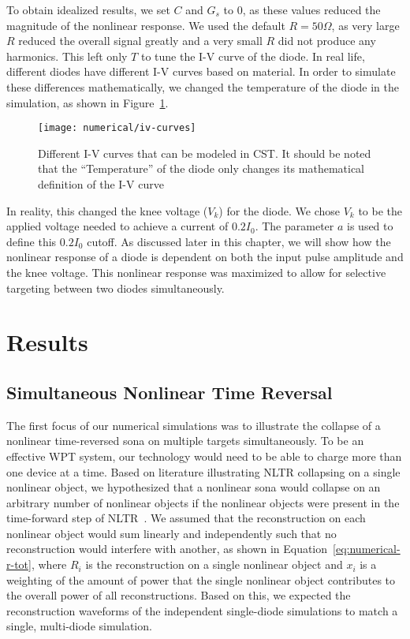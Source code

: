 To obtain idealized results, we set $C$ and $G_s$ to $0$, as these values reduced the magnitude of the nonlinear response. We used the default $R = 50 \Omega$, as very large $R$ reduced the overall signal greatly and a very small $R$ did not produce any harmonics. This left only $T$ to tune the I-V curve of the diode. In real life, different diodes have different I-V curves based on material. In order to simulate these differences mathematically, we changed the temperature of the diode in the simulation, as shown in Figure~\ref{fig:numerical-iv-curves}.

\begin{figure}[t]
\centering
\texttt{[image: numerical/iv-curves]}
\caption[I-V curves of diodes with different voltage knees]{Different I-V curves that can be modeled in CST. It should be noted that the ``Temperature'' of the diode only changes its mathematical definition of the I-V curve}
\label{fig:numerical-iv-curves}
\end{figure}

In reality, this changed the knee voltage ($V_{k}$) for the diode. We chose $V_{k}$ to be the applied voltage needed to achieve a current of $0.2 I_{0}$. The parameter $a$ is used to define this $0.2 I_{0}$ cutoff. As discussed later in this chapter, we will show how the nonlinear response of a diode is dependent on both the input pulse amplitude and the knee voltage. This nonlinear response was maximized to allow for selective targeting between two diodes simultaneously.
\section{Results}
\label{sec:numerical-results}

\subsection{Simultaneous Nonlinear Time Reversal}

The first focus of our numerical simulations was to illustrate the collapse of a nonlinear time-reversed sona on multiple targets simultaneously. To be an effective WPT system, our technology would need to be able to charge more than one device at a time. Based on literature illustrating NLTR collapsing on a single nonlinear object, we hypothesized that a nonlinear sona would collapse on an arbitrary number of nonlinear objects if the nonlinear objects were present in the time-forward step of NLTR~\cite{nltr-classical-waves,nltr-wave-chaotic}. We assumed that the reconstruction on each nonlinear object would sum linearly and independently such that no reconstruction would interfere with another, as shown in Equation~\ref{eq:numerical-r-tot}, where $R_{i}$ is the reconstruction on a single nonlinear object and $x_{i}$ is a weighting of the amount of power that the single nonlinear object contributes to the overall power of all reconstructions. Based on this, we expected the reconstruction waveforms of the independent single-diode simulations to match a single, multi-diode simulation.

